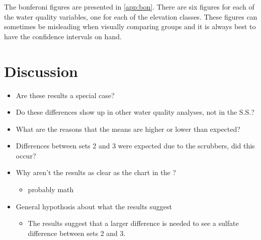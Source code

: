 
The bonferoni figures are presented in \autoref{app:bon}.
There are six figures for each of the water quality variables, one for each of the elevation classes.
These figures can sometimes be misleading when visually comparing groups and it is always best to have the confidence intervals on hand.

\section{Discussion}
\begin{itemize}
	\item Are these results a special case?
	\item Do these differences show up in other water quality analyses, not in the S.S.?
	\item What are the reasons that the means are higher or lower than expected?
	\item Differences between sets 2 and 3 were expected due to the scrubbers, did this occur?
	\item Why aren't the results as clear as the chart in the \citep{cai2012}?
	\begin{itemize}
		\item probably math
	\end{itemize}
	\item General hypothosis about what the results suggest
	\begin{itemize}
		\item The results suggest that a larger difference is needed to see a sulfate difference between sets 2 and 3.
	\end{itemize}
\end{itemize}